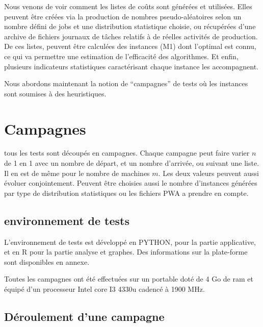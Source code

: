\documentclass[a4paper,12pt]{report}
\theoremstyle{plain}				%
\theoremstyle{definition}				%
\begin{document}
\bigskip
Nous venons de voir comment les listes de coûts sont générées et utilisées. 
Elles peuvent être créées via la production de nombres pseudo-aléatoires selon un nombre 
  défini de jobs et une distribution statistique choisie, 
  ou récupérées d'une archive de fichiers journaux de tâches relatifs à de réelles 
  activités de production.
De ces listes, peuvent être calculées des instances (M1) dont l'optimal est connu, 
  ce qui va permettre une estimation de l'efficacité des algorithmes.
Et enfin, plusieurs indicateurs statistiques caractérisant chaque instance les accompagnent.

Nous abordons maintenant la notion de ``campagnes'' de tests où les instances sont soumises à des heuristiques.  
   
\section{Campagnes} \label{sec:Campagnes}
tous les tests sont découpés en campagnes. Chaque campagne peut faire varier $n$ 
  de 1 en 1 avec un nombre de départ, et un nombre d'arrivée, 
  ou suivant une liste. 
Il en est de même pour le nombre de machines $m$. 
Les deux valeurs peuvent aussi évoluer conjointement.
Peuvent être choisies aussi le nombre d'instances générées 
  par type de distribution statistiques ou 
  les fichiers PWA a prendre en compte.
  

\subsection{environnement de tests} \label{ssec:campagnesEnvironnementDeTests}

L'environnement de tests est développé en PYTHON, pour la partie applicative, et en R pour la partie analyse et graphes. Des informations sur la plate-forme sont disponibles en annexe.

Toutes les campagnes ont été effectuées sur un portable 
  doté de 4 Go de ram et 
  équipé d'un processeur Intel core I3 4330u cadencé à 1900 MHz.

\subsection{Déroulement d'une campagne} \label{ssec:campagnesDeroullementDUneCampagne}
\end{document}
